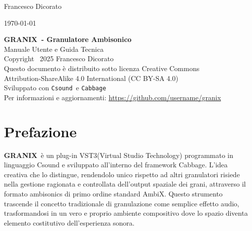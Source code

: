 \documentclass[a4paper,11pt,openany]{book}
\newcommand{\granix}{\textbf{\textcolor{granixblue}{GRANIX}}}
\newcommand{\csound}{\texttt{Csound}}
\newcommand{\cabbage}{\texttt{Cabbage}}
\begin{document}
\begin{titlepage}
    \vfill
    
    {\large Francesco Dicorato}
    
    \vspace{0.5cm}
    
    {\large \today}
    
\end{titlepage}

\newpage
\thispagestyle{empty}
\vspace*{\fill}
\begin{center}
\textbf{\granix\ - Granulatore Ambisonico}\\
Manuale Utente e Guida Tecnica\\
\vspace{1cm}
Copyright \textcopyright\ 2025 Francesco Dicorato\\
\vspace{0.5cm}
Questo documento è distribuito sotto licenza Creative Commons\\
Attribution-ShareAlike 4.0 International (CC BY-SA 4.0)\\
\vspace{1cm}
Sviluppato con \csound\ e \cabbage\\
Per informazioni e aggiornamenti: \url{https://github.com/username/granix}
\end{center}
\vspace*{\fill}

\tableofcontents
\newpage

\listoffigures
\newpage

\listoftables
\newpage

\chapter*{Prefazione}

\granix\ è un plug-in VST3(Virtual Studio Technology) programmato in linguaggio Csound e sviluppato all'interno del framework Cabbage. L'idea creativa che lo distingue, rendendolo unico rispetto ad altri granulatori risiede nella gestione ragionata e controllata dell'output spaziale dei grani, attraverso il formato ambisonics  di primo ordine standard AmbiX. Questo strumento trascende il concetto tradizionale di granulazione come semplice effetto audio, trasformandosi in un vero e proprio ambiente compositivo dove lo spazio diventa elemento costitutivo dell'esperienza sonora.
\end{document}
